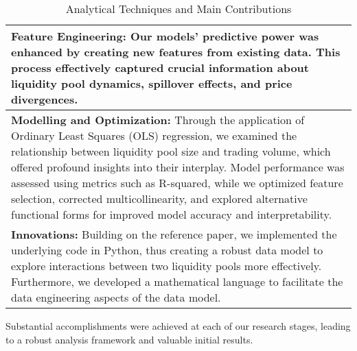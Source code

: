 \documentclass{article}
\begin{document}
\begin{table}[htbp]
  \centering
  \small
  \begin{tabularx}{\linewidth}{|>{\raggedright\arraybackslash}X|}
  \hline
  \textbf{Feature Engineering:} Our models' predictive power was enhanced by creating new features from existing data\cite{Miori2023}. This process effectively captured crucial information about liquidity pool dynamics, spillover effects, and price divergences. \\
  \hline
  \textbf{Modelling and Optimization:} Through the application of Ordinary Least Squares (OLS) regression, we examined the relationship between liquidity pool size and trading volume, which offered profound insights into their interplay\cite{Miori2023}. Model performance was assessed using metrics such as R-squared, while we optimized feature selection, corrected multicollinearity, and explored alternative functional forms for improved model accuracy and interpretability\cite{Miori2023}. \\
  \hline
  \textbf{Innovations:} Building on the reference paper, we implemented the underlying code in Python, thus creating a robust data model to explore interactions between two liquidity pools more effectively\cite{Miori2023}. Furthermore, we developed a mathematical language to facilitate the data engineering aspects of the data model\cite{Miori2023}. \\
  \hline
  \end{tabularx}
  \caption{Analytical Techniques and Main Contributions}
  \label{fig:analytical-techniques}
  \end{table}
  
  Substantial accomplishments were achieved at each of our research stages, leading to a robust analysis framework and valuable initial results\cite{Miori2023}.
\end{document}
